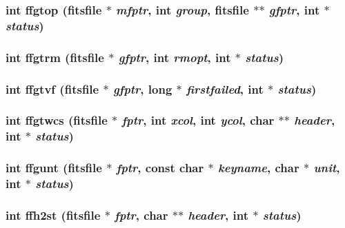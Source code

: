 \subsubsection{\setlength{\rightskip}{0pt plus 5cm}int ffgtop (\bf{fitsfile} $\ast$ {\em mfptr}, int {\em group}, \bf{fitsfile} $\ast$$\ast$ {\em gfptr}, int $\ast$ {\em status})}\label{fitsio_8h_57ba25ba0c05bbdf61f15e21900264ec}


\subsubsection{\setlength{\rightskip}{0pt plus 5cm}int ffgtrm (\bf{fitsfile} $\ast$ {\em gfptr}, int {\em rmopt}, int $\ast$ {\em status})}\label{fitsio_8h_8eb856e08aa6132af39ea5367b9f3d84}


\subsubsection{\setlength{\rightskip}{0pt plus 5cm}int ffgtvf (\bf{fitsfile} $\ast$ {\em gfptr}, long $\ast$ {\em firstfailed}, int $\ast$ {\em status})}\label{fitsio_8h_62614e8f30dfc3b69da9082d255df146}


\subsubsection{\setlength{\rightskip}{0pt plus 5cm}int ffgtwcs (\bf{fitsfile} $\ast$ {\em fptr}, int {\em xcol}, int {\em ycol}, char $\ast$$\ast$ {\em header}, int $\ast$ {\em status})}\label{fitsio_8h_8aebd57fb3bdfea239f253d351428280}


\subsubsection{\setlength{\rightskip}{0pt plus 5cm}int ffgunt (\bf{fitsfile} $\ast$ {\em fptr}, const char $\ast$ {\em keyname}, char $\ast$ {\em unit}, int $\ast$ {\em status})}\label{fitsio_8h_3ded4758cbd229441eb87d0db121198f}


\subsubsection{\setlength{\rightskip}{0pt plus 5cm}int ffh2st (\bf{fitsfile} $\ast$ {\em fptr}, char $\ast$$\ast$ {\em header}, int $\ast$ {\em status})}\label{fitsio_8h_00930d127a2fe18c8822c389b64da8c2}


